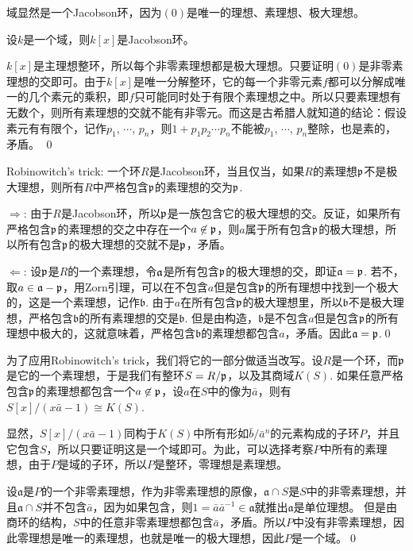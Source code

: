 域显然是一个Jacobson环，因为$(0)$是唯一的理想、素理想、极大理想。

\para 设$k$是一个域，则$k[x]$是Jacobson环。

\proof
	$k[x]$是主理想整环，所以每个非零素理想都是极大理想。只要证明$(0)$是非零素理想的交即可。由于$k[x]$是唯一分解整环，它的每一个非零元素$f$都可以分解成唯一的几个素元的乘积，即$f$只可能同时处于有限个素理想之中。所以只要素理想有无数个，则所有素理想的交就不能有非零元。而这是古希腊人就知道的结论：假设素元有有限个，记作$p_1$, $\cdots$, $p_n$，则$1+p_1p_2\cdots p_n$不能被$p_1$, $\cdots$, $p_n$整除，也是素的，矛盾。
\qed

\pro Robinowitch's trick: 一个环$R$是Jacobson环，当且仅当，如果$R$的素理想$\mathfrak{p}$不是极大理想，则所有$R$中严格包含$\mathfrak{p}$的素理想的交为$\mathfrak{p}$.

\proof $\Rightarrow$: 由于$R$是Jacobson环，所以$\mathfrak{p}$是一族包含它的极大理想的交。反证，如果所有严格包含$\mathfrak{p}$的素理想的交之中存在一个$a\not\in \mathfrak{p}$，则$a$属于所有包含$\mathfrak{p}$的极大理想，所以所有包含$\mathfrak{p}$的极大理想的交就不是$\mathfrak{p}$，矛盾。

$\Leftarrow$: 设$\mathfrak{p}$是$R$的一个素理想，令$\mathfrak{a}$是所有包含$\mathfrak{p}$的极大理想的交，即证$\mathfrak{a}=\mathfrak{p}$. 若不，取$a\in \mathfrak{a}-\mathfrak{p}$，用Zorn引理，可以在不包含$a$但是包含$\mathfrak{p}$的所有理想中找到一个极大的，这是一个素理想，记作$\mathfrak{b}$. 由于$a$在所有包含$\mathfrak{p}$的极大理想里，所以$\mathfrak{b}$不是极大理想，严格包含$\mathfrak{b}$的所有素理想的交是$\mathfrak{b}$. 但是由构造，$\mathfrak{b}$是不包含$a$但是包含$\mathfrak{p}$的所有理想中极大的，这就意味着，严格包含$\mathfrak{b}$的素理想都包含$a$，矛盾。因此$\mathfrak{a}=\mathfrak{p}$.\qed

为了应用Robinowitch's trick，我们将它的一部分做适当改写。设$R$是一个环，而$\mathfrak{p}$是它的一个素理想，于是我们有整环$S=R/\mathfrak{p}$，以及其商域$K(S)$. 如果任意严格包含$\mathfrak{p}$的素理想都包含一个$a\not\in \mathfrak{p}$，设$a$在$S$中的像为$\bar{a}$，则有$S[x]/(x\bar{a}-1)\cong K(S)$.

\proof 显然，$S[x]/(x\bar{a}-1)$同构于$K(S)$中所有形如$\bar{b}/\bar{a}^n$的元素构成的子环$P$，并且它包含$S$，所以只要证明这是一个域即可。为此，可以选择考察$P$中所有的素理想，由于$P$是域的子环，所以$P$是整环，零理想是素理想。

设$\mathfrak{a}$是$P$的一个非零素理想，作为非零素理想的原像，$\mathfrak{a}\cap S$是$S$中的非零素理想，并且$\mathfrak{a}\cap S$并不包含$\bar{a}$，因为如果包含，则$1=\bar{a}\bar{a}^{-1}\in \mathfrak{a}$就推出$\mathfrak{a}$是单位理想。 但是由商环的结构，$S$中的任意非零素理想都包含$\bar{a}$，矛盾。所以$P$中没有非零素理想，因此零理想是唯一的素理想，也就是唯一的极大理想，因此$P$是一个域。\qed

